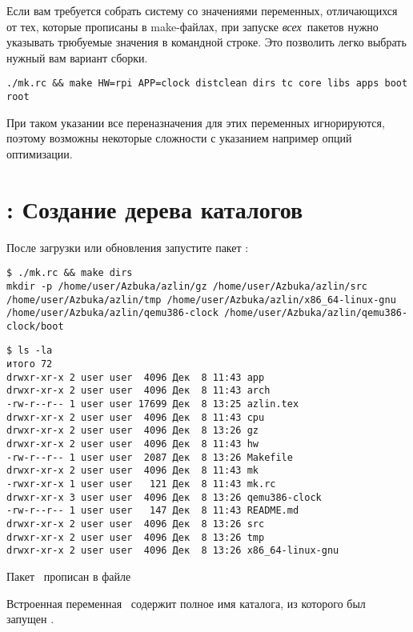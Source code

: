 Если вам требуется собрать систему со значениями переменных, отличающихся от
тех, которые прописаны в make-файлах, при запуске \emph{всех}\ пакетов нужно
указывать трюбуемые значения в командной строке. Это позволить легко выбрать
нужный вам вариант сборки.

\begin{verbatim}
./mk.rc && make HW=rpi APP=clock distclean dirs tc core libs apps boot root
\end{verbatim}

При таком указании все переназначения для этих переменных игнорируются, поэтому
возможны некоторые сложности с указанием например опций оптимизации.

\section{: Создание дерева каталогов} \label{azdirs}

После загрузки или обновления запустите пакет :

\begin{verbatim}
$ ./mk.rc && make dirs
mkdir -p /home/user/Azbuka/azlin/gz /home/user/Azbuka/azlin/src
/home/user/Azbuka/azlin/tmp /home/user/Azbuka/azlin/x86_64-linux-gnu
/home/user/Azbuka/azlin/qemu386-clock /home/user/Azbuka/azlin/qemu386-clock/boot
\end{verbatim}
\begin{verbatim}
$ ls -la
итого 72
drwxr-xr-x 2 user user  4096 Дек  8 11:43 app
drwxr-xr-x 2 user user  4096 Дек  8 11:43 arch
-rw-r--r-- 1 user user 17699 Дек  8 13:25 azlin.tex
drwxr-xr-x 2 user user  4096 Дек  8 11:43 cpu
drwxr-xr-x 2 user user  4096 Дек  8 13:26 gz
drwxr-xr-x 2 user user  4096 Дек  8 11:43 hw
-rw-r--r-- 1 user user  2087 Дек  8 13:26 Makefile
drwxr-xr-x 2 user user  4096 Дек  8 11:43 mk
-rwxr-xr-x 1 user user   121 Дек  8 11:43 mk.rc
drwxr-xr-x 3 user user  4096 Дек  8 13:26 qemu386-clock
-rw-r--r-- 1 user user   147 Дек  8 11:43 README.md
drwxr-xr-x 2 user user  4096 Дек  8 13:26 src
drwxr-xr-x 2 user user  4096 Дек  8 13:26 tmp
drwxr-xr-x 2 user user  4096 Дек  8 13:26 x86_64-linux-gnu
\end{verbatim}

Пакет \ прописан в файле


Встроенная переменная \ содержит полное имя каталога, из которого был
запущен .

